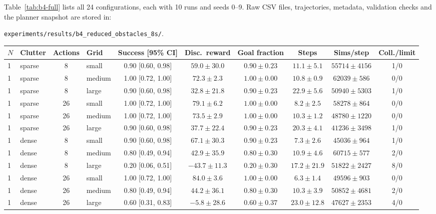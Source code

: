 \documentclass[11pt,a4paper]{article}
\begin{document}
Table~\ref{tab:b4-full} lists all 24 configurations, each with 10 runs and seeds 0--9. Raw CSV files, trajectories, metadata, validation checks and the planner snapshot are stored in:
\par\noindent\nolinkurl{experiments/results/b4_reduced_obstacles_8s/}.

\begin{table}[H]
\centering
\scriptsize
\setlength{\tabcolsep}{2.8pt}
\begin{tabular}{llclcccccc}
\toprule
$N$ & Clutter & Actions & Grid & Success [95\% CI] & Disc.\ reward & Goal fraction & Steps & Sims/step & Coll./limit \\
\midrule
1 & sparse & 8 & small & 0.90 [0.60, 0.98] & $59.0 \pm 30.0$ & $0.90 \pm 0.23$ & $11.1 \pm 5.1$ & $55714 \pm 4156$ & 1/0 \\
1 & sparse & 8 & medium & 1.00 [0.72, 1.00] & $72.3 \pm 2.3$ & $1.00 \pm 0.00$ & $10.8 \pm 0.9$ & $62039 \pm 586$ & 0/0 \\
1 & sparse & 8 & large & 0.90 [0.60, 0.98] & $32.8 \pm 21.8$ & $0.90 \pm 0.23$ & $22.9 \pm 5.6$ & $50940 \pm 5303$ & 1/0 \\
1 & sparse & 26 & small & 1.00 [0.72, 1.00] & $79.1 \pm 6.2$ & $1.00 \pm 0.00$ & $8.2 \pm 2.5$ & $58278 \pm 864$ & 0/0 \\
1 & sparse & 26 & medium & 1.00 [0.72, 1.00] & $73.5 \pm 2.9$ & $1.00 \pm 0.00$ & $10.3 \pm 1.2$ & $48780 \pm 1220$ & 0/0 \\
1 & sparse & 26 & large & 0.90 [0.60, 0.98] & $37.7 \pm 22.4$ & $0.90 \pm 0.23$ & $20.3 \pm 4.1$ & $41236 \pm 3498$ & 1/0 \\
1 & dense & 8 & small & 0.90 [0.60, 0.98] & $67.1 \pm 30.3$ & $0.90 \pm 0.23$ & $7.3 \pm 2.6$ & $45036 \pm 964$ & 1/0 \\
1 & dense & 8 & medium & 0.80 [0.49, 0.94] & $42.9 \pm 35.9$ & $0.80 \pm 0.30$ & $10.9 \pm 4.6$ & $60715 \pm 577$ & 2/0 \\
1 & dense & 8 & large & 0.20 [0.06, 0.51] & $-43.7 \pm 11.3$ & $0.20 \pm 0.30$ & $17.2 \pm 21.9$ & $51822 \pm 2427$ & 8/0 \\
1 & dense & 26 & small & 1.00 [0.72, 1.00] & $84.0 \pm 3.6$ & $1.00 \pm 0.00$ & $6.3 \pm 1.4$ & $49596 \pm 903$ & 0/0 \\
1 & dense & 26 & medium & 0.80 [0.49, 0.94] & $44.2 \pm 36.1$ & $0.80 \pm 0.30$ & $10.3 \pm 3.9$ & $50852 \pm 4681$ & 2/0 \\
1 & dense & 26 & large & 0.60 [0.31, 0.83] & $-5.8 \pm 28.6$ & $0.60 \pm 0.37$ & $23.0 \pm 12.8$ & $47627 \pm 2353$ & 4/0 \\

\end{tabular}
\end{table}
\end{document}
